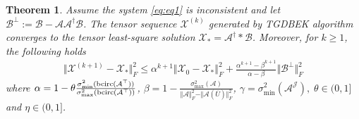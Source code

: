 \documentclass[11pt]{article}
\newtheorem{theorem}{Theorem}[section]
\def\fm#1{\mathcal{#1}}
\begin{document}
\begin{theorem} Assume the system  \eqref{eq:eq1} is inconsistent and let $\fm B^\perp := \fm B - \fm A \fm A^\dagger \fm B$. The tensor sequence $\fm X^{(k)}$ generated  by TGDBEK algorithm  converges to the  tensor least-square solution $\fm X_\ast = \fm A^\dagger * \fm B$. Moreover, for $k\geq 1$, the following holds
\begin{align}
    \Vert \fm X ^{(k+1)} - \fm X_\ast \Vert_F^2 \leq \alpha^{k+1}\Vert \fm X_0 - \fm X_\ast \Vert_F^2 + \frac{\alpha^{k+1}-\beta^{k+1}}{\alpha - \beta}\Vert \fm B^\perp \Vert_F^2
\end{align}
where $ \alpha = 1 - \theta \frac{\sigma_{\min}^2(\bcirc(\fm A^\top))}{\sigma^2_{\max}(\bcirc(\fm A^\top ))}$, $\beta = 1- \frac{\sigma^2_{\max}(\fm A)}{\Vert \fm A \Vert^2_F - \Vert \fm A(\overline{U}) \Vert_F^2}$, $\gamma = \sigma^2_{\min}(\fm A^{\fm J}), \; \theta \in (0,1]$ and $\eta \in (0, 1]$.
\end{theorem}
\end{document}
